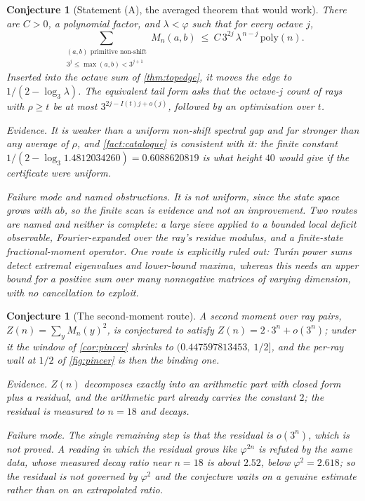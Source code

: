 \documentclass[11pt]{amsart}
\newtheorem{conjecture}[theorem]{Conjecture}
\theoremstyle{definition}
\theoremstyle{remark}
\begin{document}
\begin{conjecture}[Statement (A), the averaged theorem that would work]
\label{con:statementA}
There are $C > 0$, a polynomial factor, and $\lambda < \varphi$ such that for every octave $j$,
\[
  \sum_{\substack{(a,b) \text{ primitive non-shift} \\ 3^j \le \max(a,b) < 3^{j+1}}} M_n(a,b) \ \le \ C\, 3^{2j}\, \lambda^{\,n-j}\, \mathrm{poly}(n) .
\]
Inserted into the octave sum of \cref{thm:topedge}, it moves the edge to $1/(2 - \log_3\lambda)$. The equivalent tail form asks that the octave-$j$ count of rays with $\rho \ge t$ be at most $3^{2j - I(t)j + o(j)}$, followed by an optimisation over $t$.

\emph{Evidence.} It is weaker than a uniform non-shift spectral gap and far stronger than any average of $\rho$, and \cref{fact:catalogue} is consistent with it: the finite constant $1/(2 - \log_3 1.4812034260) = 0.6088620819$ is what height $40$ would give if the certificate were uniform.

\emph{Failure mode and named obstructions.} It is not uniform, since the state space grows with $ab$, so the finite scan is evidence and not an improvement. Two routes are named and neither is complete: a large sieve applied to a bounded local deficit observable, Fourier-expanded over the ray's residue modulus, and a finite-state fractional-moment operator. One route is explicitly ruled out: Tur\'an power sums detect extremal eigenvalues and lower-bound maxima, whereas this needs an upper bound for a positive sum over many nonnegative matrices of varying dimension, with no cancellation to exploit.
\end{conjecture}

\begin{conjecture}[The second-moment route]
\label{con:z}
A second moment over ray pairs, $Z(n) = \sum_y M_n(y)^2$, is conjectured to satisfy $Z(n) = 2 \cdot 3^n + o(3^n)$; under it the window of \cref{cor:pincer} shrinks to $(0.447597813453,\ 1/2]$, and the per-ray wall at $1/2$ of \cref{fig:pincer} is then the binding one.

\emph{Evidence.} $Z(n)$ decomposes exactly into an arithmetic part with closed form plus a residual, and the arithmetic part already carries the constant $2$; the residual is measured to $n = 18$ and decays.

\emph{Failure mode.} The single remaining step is that the residual is $o(3^n)$, which is not proved. A reading in which the residual grows like $\varphi^{2n}$ is refuted by the same data, whose measured decay ratio near $n = 18$ is about $2.52$, below $\varphi^2 = 2.618$; so the residual is not governed by $\varphi^2$ and the conjecture waits on a genuine estimate rather than on an extrapolated ratio.
\end{conjecture}
\end{document}
